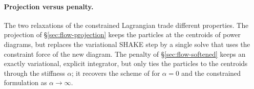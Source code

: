 \documentclass[main.tex]{subfiles}
\begin{document}
\paragraph{Projection versus penalty.}
The two relaxations of the constrained Lagrangian trade different properties.
The projection of \S\ref{sec:flow-projection} keeps the particles at the centroids of power diagrams, but replaces the variational SHAKE step by a single solve that uses the constraint force of the new diagram.
The penalty of \S\ref{sec:flow-softened} keeps an exactly variational, explicit integrator, but only ties the particles to the centroids through the stiffness $\alpha$; it recovers the scheme of \citet{Gallouet2018Lagrangian} for $\alpha \!=\! 0$ and the constrained formulation as $\alpha \!\to\! \infty$.
\end{document}
